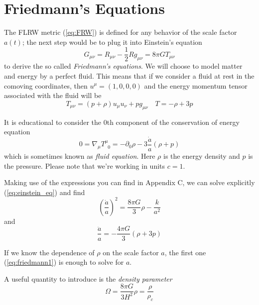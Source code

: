 \newpage
\section{Friedmann's Equations}

The FLRW metric (\ref{eq:FRW}) is defined for any behavior of the scale factor $a(t)$; the next step would be to plug it into Einstein's equation
\begin{equation}
    G_{\mu\nu} = R_{\mu\nu}-\frac{1}{2}Rg_{\mu\nu} = 8\pi G T_{\mu\nu}
    \label{eq:einstein_eq}
\end{equation}
to derive the so called \emph{Friedmann's equations}. We will choose to model matter and energy by a perfect fluid. This means that if we consider a fluid at rest in the comoving coordinates, then $u^{\mu} = (1,0,0,0)$ and the energy momentum tensor associated with the fluid will be
\begin{equation}
    T_{\mu\nu} = (p+\rho)u_{\mu}u_{\nu} +pg_{\mu\nu} \quad T = -\rho +3p
    \label{eq:perfectfluid}
\end{equation}
\par It is educational to consider the 0th component of the conservation of energy equation
\begin{equation}
    0 = \nabla_{\mu}T^{\mu}_{\; \;0} = -\partial_{0}\rho-3\frac{\dot{a}}{a}(\rho+p)
    \label{eq:fluidequation}
\end{equation}
which is sometimes known as \emph{fluid equation}. Here $\rho$ is the energy density and $p$ is the pressure. Please note that we're working in units $c=1$.
\par Making use of the expressions you can find in Appendix C, we can solve explicitly (\ref{eq:einstein_eq}) and find
\begin{equation}
    \boxed{
    \left(\frac{\dot{a}}{a}\right)^{2} = \frac{8\pi G}{3}\rho -\frac{k}{a^{2}}
    }
    \label{eq:friedmann1}
\end{equation}
and 
\begin{equation}
    \boxed{
        \frac{\ddot{a}}{a} = -\frac{4\pi G}{3}(\rho + 3p)
    }
    \label{eq:friedmann2}
\end{equation}
\par If we know the dependence of $\rho$ on the scale factor $a$, the first one (\ref{eq:friedmann1}) is enough to solve for $a$.
\par A useful quantity to introduce is the \emph{density parameter}
\begin{equation}
    \boxed{
        \Omega = \frac{8\pi G}{3H^{2}}\rho = \frac{\rho}{\rho_{c}}
    }
    \label{eq:densityparam}
\end{equation}
